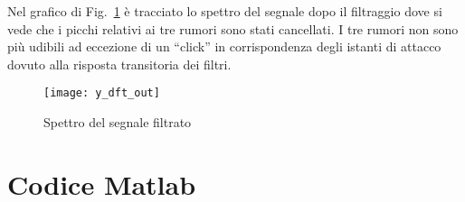\documentclass{article}
\newcommand{\includecode}[1]{}
\newcommand{\fig}[1]{Fig.~\ref{#1}}
\begin{document}
Nel grafico di \fig{plot:y_dft_out} è tracciato lo spettro del segnale
dopo il filtraggio dove si vede che i picchi relativi ai tre rumori
sono stati cancellati. I tre rumori non sono più udibili ad eccezione
di un ``click'' in corrispondenza degli istanti di attacco dovuto alla
risposta transitoria dei filtri.

\begin{figure}[h]
  \centering
  \texttt{[image: y\_dft\_out]}
  \caption{Spettro del segnale filtrato}
  \label{plot:y_dft_out}
\end{figure}

\clearpage

\section{Codice Matlab}
\includecode{notch\string_filter.m}
\includecode{single\string_freq\string_filter.m}
\includecode{find\string_noise.m}
\includecode{find\string_noise\string_start.m}
\includecode{find\string_noise\string_amplitude.m}
\includecode{progetto.m}
\end{document}
